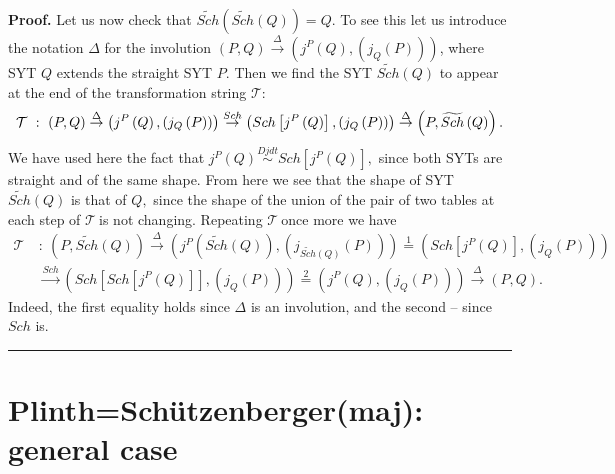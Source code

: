 \documentclass[12pt]{article}%
\newenvironment{proof}[1][Proof]{\noindent\textbf{#1.} }{\ \rule{0.5em}{0.5em}}
\begin{document}
\begin{proof}
Let us now check that $\widetilde{Sch}\left(  \widetilde{Sch}\left(  Q\right)
\right)  =Q.$ To see this let us introduce the notation $\Delta$ for the
involution $\left(  P,Q\right)  \overset{\Delta}{\rightarrow}\left(
j^{P}\left(  Q\right)  ,\left(  j_{Q}\left(  P\right)  \right)  \right)  $,
where SYT $Q$ extends the straight SYT $P.$ Then we find the SYT
$\widetilde{Sch}\left(  Q\right)  $ to appear at the end of the transformation
string $\mathcal{T}$:\newline%
\[
\mathcal{T\ }:\ \left(  P,Q\right)  \overset{\Delta}{\rightarrow}\left(
j^{P}\left(  Q\right)  ,\left(  j_{Q}\left(  P\right)  \right)  \right)
\overset{Sch}{\rightarrow}\left(  Sch\left[  j^{P}\left(  Q\right)  \right]
,\left(  j_{Q}\left(  P\right)  \right)  \right)  \overset{\Delta}%
{\rightarrow}\left(  P,\widetilde{Sch}\left(  Q\right)  \right)  .\newline%
\]
We have used here the fact that $j^{P}\left(  Q\right)  \overset{Djdt}{\sim
}Sch\left[  j^{P}\left(  Q\right)  \right]  ,$ since both SYTs are straight
and of the same shape. From here we see that the shape of SYT $\widetilde
{Sch}\left(  Q\right)  $ is that of $Q,$ since the shape of the union of the
pair of two tables at each step of $\mathcal{T\ }$is not changing. Repeating
$\mathcal{T}\ $once more we have%
\begin{align*}
\mathcal{T\ }  &  :\ \left(  P,\widetilde{Sch}\left(  Q\right)  \right)
\overset{\Delta}{\rightarrow}\left(  j^{P}\left(  \widetilde{Sch}\left(
Q\right)  \right)  ,\left(  j_{\widetilde{Sch}\left(  Q\right)  }\left(
P\right)  \right)  \right)  \overset{1}{=}\left(  Sch\left[  j^{P}\left(
Q\right)  \right]  ,\left(  j_{Q}\left(  P\right)  \right)  \right) \\
&  \overset{Sch}{\rightarrow}\left(  Sch\left[  Sch\left[  j^{P}\left(
Q\right)  \right]  \right]  ,\left(  j_{Q}\left(  P\right)  \right)  \right)
\overset{2}{=}\left(  j^{P}\left(  Q\right)  ,\left(  j_{Q}\left(  P\right)
\right)  \right)  \overset{\Delta}{\rightarrow}\left(  P,Q\right)  .
\end{align*}
Indeed, the first equality holds since $\Delta$ is an involution, and the
second -- since $Sch$ is.
\end{proof}

\section{Plinth=Sch\"{u}tzenberger(maj): general case}
\end{document}

